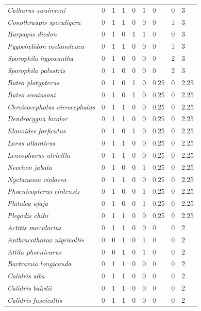 \documentclass[
  oneside]{scrbook}
\begin{document}
\begin{longtable}[t]{>{}lrrrrrlrl}
\em{Catharus swainsoni} & 0 & 1 & 1 & 0 & 1 & 0 & 0 & 3\\
\em{Conothraupis speculigera} & 0 & 1 & 1 & 0 & 0 & 0 & 1 & 3\\
\em{Harpagus diodon} & 0 & 1 & 0 & 1 & 1 & 0 & 0 & 3\\
\em{Pygochelidon melanoleuca} & 0 & 1 & 1 & 0 & 0 & 0 & 1 & 3\\
\addlinespace
\em{Sporophila hypoxantha} & 0 & 1 & 0 & 0 & 0 & 0 & 2 & 3\\
\em{Sporophila palustris} & 0 & 1 & 0 & 0 & 0 & 0 & 2 & 3\\
\em{Buteo platypterus} & 0 & 1 & 0 & 1 & 0 & 0.25 & 0 & 2.25\\
\em{Buteo swainsoni} & 0 & 1 & 0 & 1 & 0 & 0.25 & 0 & 2.25\\
\em{Chroicocephalus cirrocephalus} & 0 & 1 & 1 & 0 & 0 & 0.25 & 0 & 2.25\\
\addlinespace
\em{Dendrocygna bicolor} & 0 & 1 & 1 & 0 & 0 & 0.25 & 0 & 2.25\\
\em{Elanoides forficatus} & 0 & 1 & 0 & 1 & 0 & 0.25 & 0 & 2.25\\
\em{Larus atlanticus} & 0 & 1 & 1 & 0 & 0 & 0.25 & 0 & 2.25\\
\em{Leucophaeus atricilla} & 0 & 1 & 1 & 0 & 0 & 0.25 & 0 & 2.25\\
\em{Neochen jubata} & 0 & 1 & 0 & 0 & 1 & 0.25 & 0 & 2.25\\
\addlinespace
\em{Nyctanassa violacea} & 0 & 1 & 1 & 0 & 0 & 0.25 & 0 & 2.25\\
\em{Phoenicopterus chilensis} & 0 & 1 & 0 & 0 & 1 & 0.25 & 0 & 2.25\\
\em{Platalea ajaja} & 0 & 1 & 0 & 0 & 1 & 0.25 & 0 & 2.25\\
\em{Plegadis chihi} & 0 & 1 & 1 & 0 & 0 & 0.25 & 0 & 2.25\\
\em{Actitis macularius} & 0 & 1 & 1 & 0 & 0 & 0 & 0 & 2\\
\addlinespace
\em{Anthracothorax nigricollis} & 0 & 0 & 1 & 0 & 1 & 0 & 0 & 2\\
\em{Attila phoenicurus} & 0 & 0 & 1 & 0 & 1 & 0 & 0 & 2\\
\em{Bartramia longicauda} & 0 & 1 & 1 & 0 & 0 & 0 & 0 & 2\\
\em{Calidris alba} & 0 & 1 & 1 & 0 & 0 & 0 & 0 & 2\\
\em{Calidris bairdii} & 0 & 1 & 1 & 0 & 0 & 0 & 0 & 2\\
\addlinespace
\em{Calidris fuscicollis} & 0 & 1 & 1 & 0 & 0 & 0 & 0 & 2\\

\end{longtable}
\end{document}
